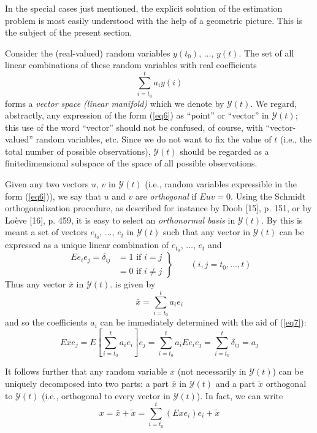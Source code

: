 \documentclass{article}
\newcommand{\manf}[1]{\mathbf{\mathcal{#1}}}
\begin{document}
In the special cases just mentioned, the explicit solution of the estimation problem is most easily understood with the help of a geometric picture. This is the subject of the present section.

Consider the (real-valued) random variables $y(t_0)$, $\dotsc$, $y(t)$. The set of all linear combinations of these random variables with real
coefficients
\begin{equation}
\label{eq6}
\sum^t_{i=t_0}a_i y(i)
\end{equation}
forms a \emph{vector space (linear manifold)} which we denote by $\mathbf{\mathcal{Y}}(t)$. We regard, abstractly, any expression of the form (\ref{eq6}) as “point” or “vector” in $\manf{Y}(t)$; this use of the word “vector” should not be confused, of course, with “vector-valued” random variables, etc. Since we do not want to fix the value of $t$ (i.e., the total number of possible observations), $\manf{Y}(t)$ should be regarded as a finitedimensional subspace of the space of all possible observations.

Given any two vectors $u$, $v$ in $\manf{Y}(t)$ (i.e., random variables expressible in the form (\ref{eq6})), we say that $u$ and $v$ are \emph{orthogonal} if $Euv = 0$. Using the Schmidt orthogonalization procedure, as described for instance by Doob [15], p. 151, or by Lo\`{e}ve [16], p. 459, it is easy to select an \emph{orthonormal basis} in $\manf{Y}(t)$. By this is meant a set of vectors $e_{t_0}$, $\dotsc$, $e_t$ in $\manf{Y}(t)$ such that any vector in $\manf{Y}(t)$ can be expressed as a unique linear combination of $e_{t_0}$, $\dotsc$, $e_t$ and
\begin{equation}
\label{eq7}
\left.\begin{aligned}
Ee_ie_j=\delta_{ij}&=1 \text{ if } i = j\\
&=0 \text{ if } i \ne j
\end{aligned}\right\}
\qquad (i,j=t_0,\dotsc,t)
\end{equation}
Thus any vector $\bar{x}$ in $\manf{Y}(t)$. is given by
\begin{equation*}
\bar{x}=\sum^t_{i=t_0}a_ie_i
\end{equation*}
and so the coefficients $a_i$ can be immediately determined with the
aid of (\ref{eq7}):
\begin{equation}
\label{eq8}
E\bar{x}e_j=E[\sum^t_{i=t_0}a_ie_i]e_j=\sum^t_{i=t_0}a_iEe_ie_j=\sum^t_{i=t_0}\delta_{ij}=a_j
\end{equation}

It follows further that any random variable $x$ (not necessarily in $\manf{Y}(t)$) can be uniquely decomposed into two parts: a part $\bar{x}$ in $\manf{Y}(t)$ and a part $\tilde{x}$ orthogonal to $\manf{Y}(t)$ (i.e., orthogonal to every vector in $\manf{Y}(t)$). In fact, we can write
\begin{equation}
\label{eq9}
x=\bar{x}+\tilde{x}=\sum^t_{i=t_0}(Exe_i)e_i+\tilde{x}
\end{equation}
\end{document}
